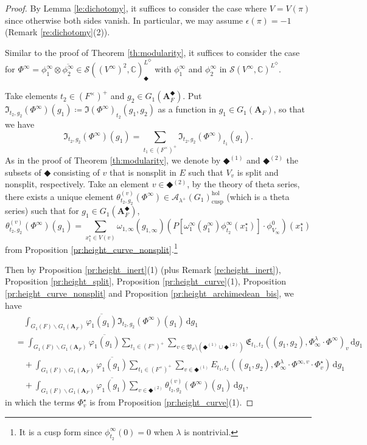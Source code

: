 \documentclass[12pt]{amsart}
\numberwithin{equation}{section}
\theoremstyle{plain}
\theoremstyle{definition}
\theoremstyle{remark}
\renewcommand{\b}[1]{\mathbf{#1}}
\renewcommand{\c}[1]{\mathcal{#1}}
\renewcommand{\d}[1]{\mathbb{#1}}
\newcommand{\f}[1]{\mathfrak{#1}}
\renewcommand{\r}[1]{\mathrm{#1}}
\newcommand{\s}[1]{\mathscr{#1}}
\renewcommand{\(}{\left(}
\renewcommand{\)}{\right)}
\newcommand{\ol}[1]{\overline{#1}{}}
\newcommand{\bA}{\b A}
\newcommand{\cA}{\c A}
\newcommand{\dC}{\d C}
\newcommand{\fE}{\f E}
\newcommand{\fI}{\f I}
\newcommand{\fV}{\f V}
\newcommand{\rd}{\,\r d}
\newcommand{\sS}{\s S}
\newcommand{\cusp}{\r{cusp}}
\newcommand{\hol}{\r{hol}}
\begin{document}
\begin{proof}
By Lemma \ref{le:dichotomy}, it suffices to consider the case where $V=V(\pi)$ since otherwise both sides vanish. In particular, we may assume $\epsilon(\pi)=-1$ (Remark \ref{re:dichotomy}(2)).

Similar to the proof of Theorem \ref{th:modularity}, it suffices to consider the case for $\Phi^\infty=\phi^\infty_1\otimes\ol{\phi^\infty_2}\in\sS((V^\infty)^2,\dC)^{L^\Diamond}_\Diamondblack$ with $\phi^\infty_1$ and $\phi^\infty_2$ in $\sS(V^\infty,\dC)^{L^\Diamond}$.

Take elements $t_2\in (F^\times)^+$ and $g_2\in G_1(\bA_F^\Diamondblack)$. Put $\fI_{t_2,g_2}(\Phi^\infty)(g_1)\coloneqq\fI(\Phi^\infty)_{t_2}(g_1,g_2)$ as a function in $g_1\in G_1(\bA_F)$, so that we have
\[
\fI_{t_2,g_2}(\Phi^\infty)(g_1)=\sum_{t_1\in (F^\times)^+}\fI_{t_2,g_2}(\Phi^\infty)_{t_1}(g_1).
\]
As in the proof of Theorem \ref{th:modularity}, we denote by $\Diamondblack^{(1)}$ and $\Diamondblack^{(2)}$ the subsets of $\Diamondblack$ consisting of $v$ that is nonsplit in $E$ such that $V_v$ is split and nonsplit, respectively. Take an element $v\in\Diamondblack^{(2)}$, by the theory of theta series, there exists a unique element $\theta^{(v)}_{t_2,g_2}(\Phi^\infty)\in\cA_{\lambda^+}(G_1)_\cusp^\hol$ (which is a theta series) such that for $g_1\in G_1(\bA_F^\Diamondblack)$,
\[
\theta^{(v)}_{t_2,g_2}(\Phi^\infty)(g_1)=
\sum_{x^\star_1\in V(v)}\omega_{1,\infty}(g_{1,\infty})
\(P[\omega_1^\infty(g_1^\infty)\phi^\infty_{t_2}(x^\star_1)]\cdot\phi^0_{V_\infty}\)(x^\star_1)
\]
from Proposition \ref{pr:height_curve_nonsplit}.\footnote{It is a cusp form since $\phi^\infty_{t_2}(0)=0$ when $\lambda$ is nontrivial.}

Then by Proposition \ref{pr:height_inert}(1) (plus Remark \ref{re:height_inert}), Proposition \ref{pr:height_split}, Proposition \ref{pr:height_curve}(1), Proposition \ref{pr:height_curve_nonsplit} and Proposition \ref{pr:height_archimedean_bis}, we have
\begin{align*}
&\quad\int_{G_1(F)\backslash G_1(\bA_F)}\ol{\varphi_1(g_1)}\fI_{t_2,g_2}(\Phi^\infty)(g_1)\rd g_1 \\
&=\int_{G_1(F)\backslash G_1(\bA_F)}\ol{\varphi_1(g_1)}
\sum_{t_1\in(F^\times)^+}\sum_{v\in\fV_F\setminus(\Diamondblack^{(1)}\cup\Diamondblack^{(2)})}
\fE_{t_1,t_2}((g_1,g_2),\Phi^\lambda_\infty\cdot\Phi^\infty)_v \rd g_1\\
&\quad +\int_{G_1(F)\backslash G_1(\bA_F)}\ol{\varphi_1(g_1)}
\sum_{t_1\in(F^\times)^+}
\sum_{v\in\Diamondblack^{(1)}}E_{t_1,t_2}((g_1,g_2),\Phi^\lambda_\infty\cdot\Phi^{\infty,v}\cdot\Phi^\star_v)\rd g_1 \\
&\quad +\int_{G_1(F)\backslash G_1(\bA_F)}\ol{\varphi_1(g_1)}\sum_{v\in\Diamondblack^{(2)}}\theta^{(v)}_{t_2,g_2}(\Phi^\infty)(g_1)\rd g_1,
\end{align*}
in which the terms $\Phi^\star_v$ is from Proposition \ref{pr:height_curve}(1).


\end{proof}
\end{document}
